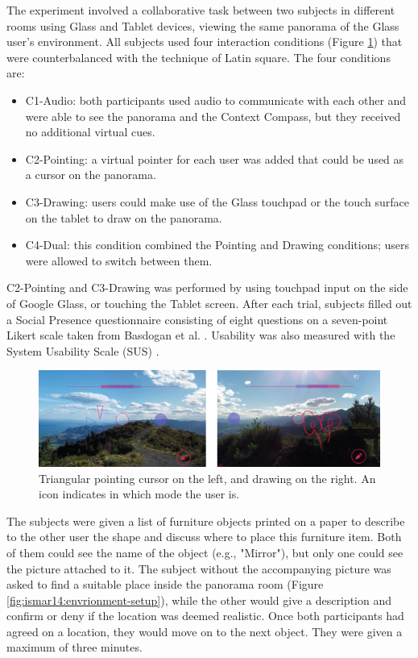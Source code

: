 The experiment involved a collaborative task between two subjects in different rooms using Glass and Tablet devices, viewing the same panorama of the Glass user's environment. All subjects used four interaction conditions (Figure \ref{fig:ismar14:pointing-drawing}) that were counterbalanced with the technique of Latin square. The four conditions are:

\begin{itemize}
    \item C1-Audio: both participants used audio to communicate with each other and were able to see the panorama and the Context Compass, but they received no additional virtual cues. 
    \item C2-Pointing: a virtual pointer for each user was added that could be used as a cursor on the panorama.
    \item C3-Drawing: users could make use of the Glass touchpad or the touch surface on the tablet to draw on the panorama. 
    \item C4-Dual: this condition combined the Pointing and Drawing conditions; users were allowed to switch between them.
\end{itemize}{}

C2-Pointing and C3-Drawing was performed by using touchpad input on the side of Google Glass, or touching the Tablet screen. After each trial, subjects filled out a Social Presence questionnaire consisting of eight questions on a seven-point Likert scale taken from Basdogan et al. \cite{Basdogan2001}. Usability was also measured with the System Usability Scale (SUS) \cite{brooke1996sus}.

\begin{figure}
    \centering
    \includegraphics[width=\linewidth]{images/63-pano-ismar14/pointing-drawing}
    \caption{Triangular pointing cursor on the left, and drawing on the right. An icon indicates in which mode the user is.}
    \label{fig:ismar14:pointing-drawing}
\end{figure}

The subjects were given a list of furniture objects printed on a paper to describe to the other user the shape and discuss where to place this furniture item. Both of them could see the name of the object (e.g., "Mirror"), but only one could see the picture attached to it. The subject without the accompanying picture was asked to find a suitable place inside the panorama room (Figure \ref{fig:ismar14:envrionment-setup}), while the other would give a description and confirm or deny if the location was deemed realistic. Once both participants had agreed on a location, they would move on to the next object. They were given a maximum of three minutes.

